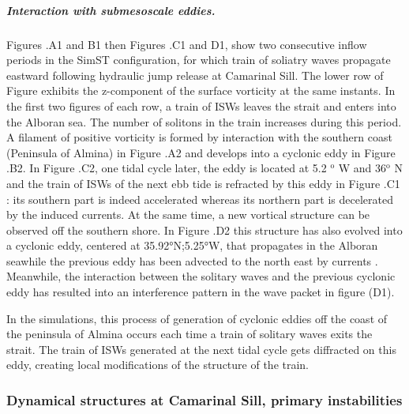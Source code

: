 \subparagraph{Interaction with submesoscale eddies.}
Figures .A1 and B1 then Figures .C1 and D1, show two consecutive inflow periods in the SimST configuration, for which train of soliatry waves propagate eastward following hydraulic jump release at Camarinal Sill. The lower row of Figure  exhibits the z-component of the surface vorticity at the same instants. In the first two figures of each row, a train of ISWs leaves the strait and enters into the Alboran sea. The number of solitons in the train increases during this period. A filament of positive vorticity is formed by interaction with the southern coast (Peninsula of Almina) in Figure .A2 and develops into a cyclonic eddy in Figure .B2. In Figure .C2, one tidal cycle later, the eddy is located at 5.2 $^\text{o}$ W and 36$^\text{o}$ N and the train of ISWs of the next ebb tide is refracted by this eddy in Figure .C1 : its southern part is indeed accelerated whereas its northern part is decelerated by the induced currents. At the same time, a new vortical structure can be observed off the southern shore. In Figure .D2 this structure has also evolved into a cyclonic eddy, centered at 35.92°N;5.25°W, that propagates in the Alboran sea\color{red}while the previous eddy has been advected to the north east by currents \color{black}. Meanwhile, the interaction between the solitary waves and the previous cyclonic eddy has resulted into an interference pattern in the wave packet in figure (D1). 

In the simulations, this process of generation of cyclonic eddies off the coast of the peninsula of Almina occurs each time a train of solitary waves exits the strait. The train of ISWs generated at the next tidal cycle gets diffracted on this eddy, creating local modifications of the structure of the train.

\subsubsection{Dynamical structures at Camarinal Sill, primary instabilities}
\label{sectionsim3D_res_insta}

